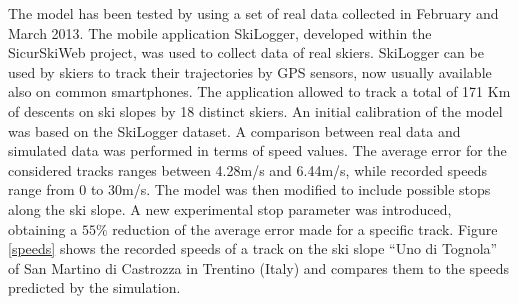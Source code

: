 \documentclass[12pt,a4paper,twoside]{book}
\begin{document}
The model has been tested by using a set of real data collected in February and March 2013. The mobile application SkiLogger, developed within the SicurSkiWeb project, was used to collect data of real skiers. SkiLogger can be used by skiers to track their trajectories by GPS sensors, now usually available also on common smartphones. The application allowed to track a total of 171 Km of descents on ski slopes by 18 distinct skiers. An initial calibration of the model was based on the SkiLogger dataset. A comparison between real data and simulated data was performed in terms of speed values. The average error for the considered tracks ranges between 4.28m/s and 6.44m/s, while recorded speeds range from 0 to 30m/s. The model was then modified to include possible stops along the ski slope. A new experimental stop parameter was introduced, obtaining a $55\%$ reduction of the average error made for a specific track. Figure \ref{speeds} shows the recorded speeds of a track on the ski slope ``Uno di Tognola'' of San Martino di Castrozza in Trentino (Italy) and compares them to the speeds predicted by the simulation.
\end{document}
